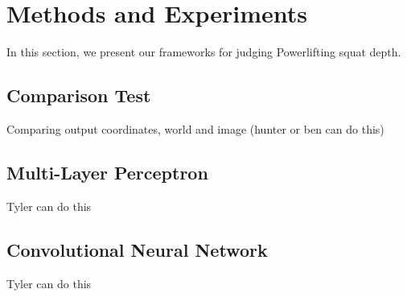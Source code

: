 \section{Methods and Experiments}
\label{sec:formatting}
In this section, we present our frameworks for judging Powerlifting squat depth.
\subsection{Comparison Test}
Comparing output coordinates, world and image (hunter or ben can do this)
\subsection{Multi-Layer Perceptron}
Tyler can do this
\subsection{Convolutional Neural Network}
Tyler can do this


